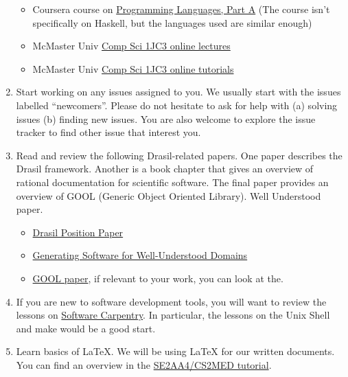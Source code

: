 \documentclass[12pt]{article}
\begin{document}
\begin{enumerate}
\begin{itemize}
\item Coursera course on
\href{https://www.coursera.org/learn/programming-languages} {Programming
Languages, Part A} (The course isn't specifically on Haskell, but the languages
used are similar enough)

\item McMaster Univ
\href{https://www.youtube.com/watch?v=eGwR_MiIT_A&list=PLknslYp7IpnJYHyJd02cOsp0ZBKxWBXK9}
{Comp Sci 1JC3 online lectures} 

\item McMaster Univ
\href{https://www.youtube.com/watch?v=7WxbuAztuFs&list=PLHRF-X-NtQR4MZBvm05NshPIEI8ELID5m}
{Comp Sci 1JC3 online tutorials} 

\end{itemize}

\item Start working on any issues assigned to you.  We usually start with the
issues labelled ``newcomers''.  Please do not hesitate to ask for help with (a)
solving issues (b) finding new issues.  You are also welcome to explore the
issue tracker to find other issue that interest you.

\item Read and review the following Drasil-related papers.  One paper describes
the Drasil framework.  Another is a book chapter that gives an overview of
rational documentation for scientific software.  The final paper provides an
overview of GOOL (Generic Object Oriented Library).  Well Understood paper.

\begin{itemize}

\item
\href{https://gitlab.cas.mcmaster.ca/smiths/pub/-/blob/master/SzymczakEtAl2016.pdf}
{Drasil Position Paper} 

\item \href{https://arxiv.org/abs/2302.00740} {Generating Software for
Well-Understood Domains}

\item \href{https://arxiv.org/abs/1911.11824} {GOOL paper}, if relevant to
your work, you can look at the.

\end{itemize}

\item If you are new to software development tools, you will want to review the
lessons on \href{http://software-carpentry.org/lessons/} {Software Carpentry}.
In particular, the lessons on the Unix Shell and make would be a good start.

\item Learn basics of LaTeX.  We will be using LaTeX for our written documents.
You can find an overview in the
\href{https://gitlab.cas.mcmaster.ca/smiths/se2aa4_cs2me3/-/tree/master/Tutorials\%2FT02a-LaTeX}
{SE2AA4/CS2MED tutorial}.

\end{enumerate}
\end{document}
